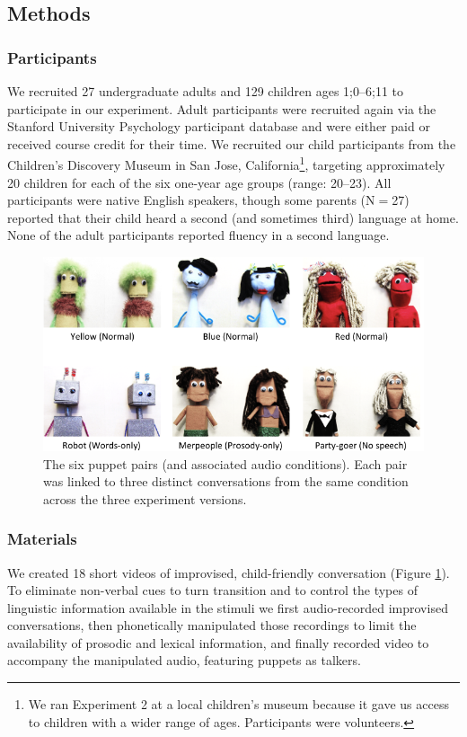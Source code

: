 \documentclass[authoryear, 12pt]{elsarticle}
\begin{document}
\subsection*{Methods}
\label{sec:methods2}

\subsubsection*{Participants}
We recruited 27 undergraduate adults and 129 children ages 1;0--6;11 to participate in our experiment. Adult participants were recruited again via the Stanford University Psychology participant database and were either paid or received course credit for their time. We recruited our child participants from the Children's Discovery Museum in San Jose, California\footnote{We ran Experiment 2 at a local children's museum because it gave us access to children with a wider range of ages. Participants were volunteers.}, targeting approximately 20 children for each of the six one-year age groups (range: 20--23). All participants were native English speakers, though some parents (N$=$27) reported that their child heard a second (and sometimes third) language at home. None of the adult participants reported fluency in a second language.

\begin{figure}[t]
\begin{center}
\includegraphics[width=\textwidth]{figures/FIG-EN-stim.png}
\end{center}
\caption{The six puppet pairs (and associated audio conditions). Each pair was linked to three distinct conversations from the same condition across the three experiment versions.}
\label{fig:puppets}
\end{figure}

\subsubsection*{Materials}
We created 18 short videos of improvised, child-friendly conversation (Figure \ref{fig:puppets}). To eliminate non-verbal cues to turn transition and to control the types of linguistic information available in the stimuli we first audio-recorded improvised conversations, then phonetically manipulated those recordings to limit the availability of prosodic and lexical information, and finally recorded video to accompany the manipulated audio, featuring puppets as talkers. 
\end{document}
